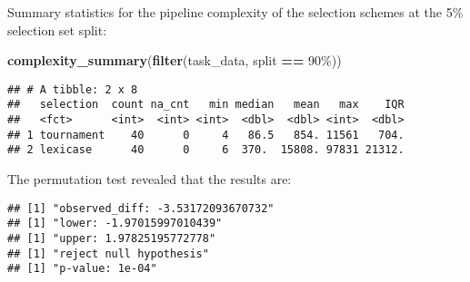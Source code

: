 \documentclass[
]{book}
\newenvironment{Shaded}{\begin{snugshade}}{\end{snugshade}}
\newcommand{\AttributeTok}[1]{\textcolor[rgb]{0.13,0.29,0.53}{#1}}
\newcommand{\DecValTok}[1]{\textcolor[rgb]{0.00,0.00,0.81}{#1}}
\newcommand{\FunctionTok}[1]{\textcolor[rgb]{0.13,0.29,0.53}{\textbf{#1}}}
\newcommand{\NormalTok}[1]{#1}
\newcommand{\OtherTok}[1]{\textcolor[rgb]{0.56,0.35,0.01}{#1}}
\newcommand{\SpecialCharTok}[1]{\textcolor[rgb]{0.81,0.36,0.00}{\textbf{#1}}}
\newcommand{\StringTok}[1]{\textcolor[rgb]{0.31,0.60,0.02}{#1}}
\begin{document}
Summary statistics for the pipeline complexity of the selection schemes at the 5\% selection set split:

\begin{Shaded}
\begin{Highlighting}[]
\FunctionTok{complexity\_summary}\NormalTok{(}\FunctionTok{filter}\NormalTok{(task\_data, split }\SpecialCharTok{==} \StringTok{\textquotesingle{}90\%\textquotesingle{}}\NormalTok{))}
\end{Highlighting}
\end{Shaded}

\begin{verbatim}
## # A tibble: 2 x 8
##   selection  count na_cnt   min median   mean   max    IQR
##   <fct>      <int>  <int> <int>  <dbl>  <dbl> <int>  <dbl>
## 1 tournament    40      0     4   86.5   854. 11561   704.
## 2 lexicase      40      0     6  370.  15808. 97831 21312.
\end{verbatim}

The permutation test revealed that the results are:

\begin{Shaded}
\end{Shaded}

\begin{verbatim}
## [1] "observed_diff: -3.53172093670732"
## [1] "lower: -1.97015997010439"
## [1] "upper: 1.97825195772778"
## [1] "reject null hypothesis"
## [1] "p-value: 1e-04"
\end{verbatim}
\end{document}
